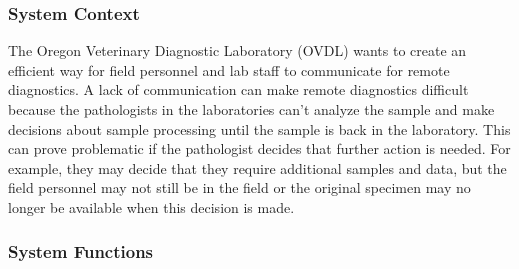 \documentclass[onecolumn, draftclsnofoot,10pt, compsoc]{IEEEtran}
\begin{document}
\subsubsection{System Context}
The Oregon Veterinary Diagnostic Laboratory (OVDL) wants to create an efficient way for field personnel and lab staff to communicate for remote diagnostics. 
A lack of communication can make remote diagnostics difficult because the pathologists in the laboratories can't analyze the sample and make decisions about sample processing until the sample is back in the laboratory. 
This can prove problematic if the pathologist decides that further action is needed. 
For example, they may decide that they require additional samples and data, but the field personnel may not still be in the field or the original specimen may no longer be available when this decision is made.

\subsubsection{System Functions}
\end{document}
